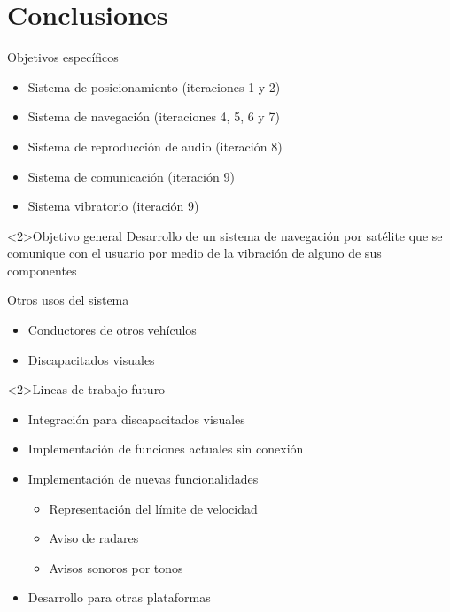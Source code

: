 \section{Conclusiones}

\begin{slide}
  \begin{block}{Objetivos específicos}
    \begin{itemize}
      \item Sistema de posicionamiento (iteraciones 1 y 2)
      \item Sistema de navegación (iteraciones 4, 5, 6 y 7)
      \item Sistema de reproducción de audio (iteración 8)
      \item Sistema de comunicación (iteración 9)
      \item Sistema vibratorio (iteración 9)
    \end{itemize}
  \end{block}
  \begin{block}<2>{Objetivo general}
    Desarrollo de un sistema de navegación por satélite que se comunique con el usuario por medio de
    la vibración de alguno de sus componentes
  \end{block}
\end{slide}

\begin{slide}
  \begin{block}{Otros usos del sistema}
    \begin{itemize}
      \item Conductores de otros vehículos
      \item Discapacitados visuales
    \end{itemize}
  \end{block}

  \begin{block}<2>{Lineas de trabajo futuro}
    \begin{itemize}
      \item Integración para discapacitados visuales
      \item Implementación de funciones actuales sin conexión
      \item Implementación de nuevas funcionalidades
        \begin{itemize}
          \item Representación del límite de velocidad
          \item Aviso de radares
          \item Avisos sonoros por tonos
        \end{itemize}
      \item Desarrollo para otras plataformas
    \end{itemize}
  \end{block}
\end{slide}

